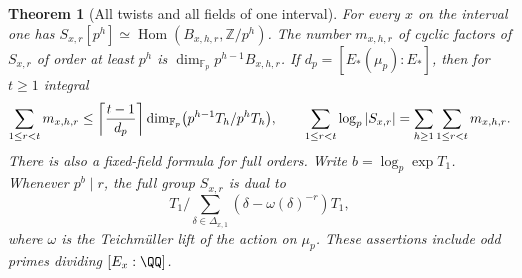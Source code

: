\documentclass[a4paper,11pt]{article}
\newtheorem{theorem}[proposition]{Theorem}
\theoremstyle{definition}
\theoremstyle{remark}
\newcommand{\ZZ}{\mathbb Z}\newcommand{\ord}{\operatorname{ord}}
\numberwithin{equation}{section}
\begin{document}
\begin{theorem}[All twists and all fields of one interval]\leavevmode
\label{thm:loginterval319}
For every \(x\) on the interval one has
\(S_{x,r}[p^h]\simeq\operatorname{Hom}(B_{x,h,r},\ZZ/p^h)\).
The number \(m_{x,h,r}\) of cyclic factors of \(S_{x,r}\)
of order at least \(p^h\) is
\(\dim_{\mathbb F_p}p^{h-1}B_{x,h,r}\). If
\(d_p=[E_*(\mu_p):E_*]\), then for \(t\ge1\) integral
\[
 \sum_{1\le r<t}m_{x,h,r}\le
       \left\lceil{t-1\over d_p}\right\rceil
       \dim_{\mathbb F_p}\bigl(p^{h-1}T_h/p^hT_h\bigr),
 \qquad
 \sum_{1\le r<t}\log_p|S_{x,r}|
             =\sum_{h\ge1}\sum_{1\le r<t}m_{x,h,r}.
\]
There is also a fixed-field formula for full orders. Write
\(b=\log_p\exp T_1\). Whenever \(p^b\mid r\), the full
group \(S_{x,r}\) is dual to
\[
 T_1\Big/\sum_{\delta\in\Delta_{x,1}}
                         (\delta-\omega(\delta)^{-r})T_1 ,
\]
where \(\omega\) is the Teichm\"uller lift of the action on
\(\mu_p\). These assertions include odd primes dividing
\([E_x:\QQ]\).
\end{theorem}
\end{document}
